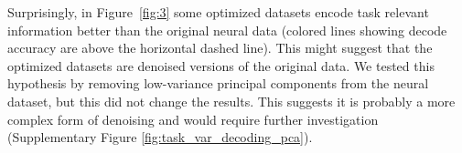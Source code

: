 \documentclass{article} %
\begin{document}


Surprisingly, in Figure~\ref{fig:3} some optimized datasets encode task relevant information better than the original neural data (colored lines showing decode accuracy are above the horizontal dashed line). This might suggest that the optimized datasets are denoised versions of the original data. We tested this hypothesis by removing low-variance principal components from the neural dataset, but this did not change the results. This suggests it is probably a more complex form of denoising and would require further investigation (Supplementary Figure \ref{fig:task_var_decoding_pca}).
\end{document}
